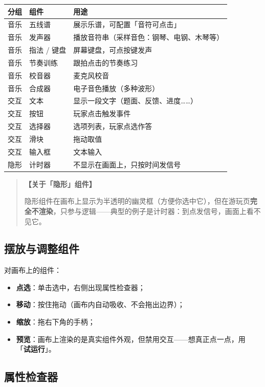 \documentclass[UTF8,a4paper,zihao=-4]{ctexart}
\newcommand{\ui}[1]{「\textbf{#1}」}  %
\newenvironment{tip}[1][提示]{%
  \begin{quote}\small\textbf{【#1】}\ignorespaces
}{\end{quote}}
\begin{document}
\begin{center}
\begin{tabular}{lll}
\toprule
分组 & 组件 & 用途 \\
\midrule
音乐 & 五线谱 & 展示乐谱，可配置「音符可点击」 \\
音乐 & 发声器 & 播放音符串（采样音色：钢琴、电钢、木琴等） \\
音乐 & 指法 / 键盘 & 屏幕键盘，可点按键发声 \\
音乐 & 节奏训练 & 跟拍点击的节奏练习 \\
音乐 & 校音器 & 麦克风校音 \\
音乐 & 合成器 & 电子音色播放（多种波形） \\
\midrule
交互 & 文本 & 显示一段文字（题面、反馈、进度……） \\
交互 & 按钮 & 玩家点击触发事件 \\
交互 & 选择器 & 选项列表，玩家点选作答 \\
交互 & 滑块 & 拖动取值 \\
交互 & 输入框 & 文本输入 \\
\midrule
隐形 & 计时器 & 不显示在画面上，只按时间发信号 \\
\bottomrule
\end{tabular}
\end{center}

\begin{tip}[关于「隐形」组件]
隐形组件在画布上显示为半透明的幽灵框（方便你选中它），但在游玩页\textbf{完全不渲染}，只参与逻辑——典型的例子是计时器：到点发信号，画面上看不见它。
\end{tip}

\subsection{摆放与调整组件}

对画布上的组件：

\begin{itemize}[nosep]
  \item \textbf{点选}：单击选中，右侧出现属性检查器；
  \item \textbf{移动}：按住拖动（画布内自动吸收、不会拖出边界）；
  \item \textbf{缩放}：拖右下角的手柄；
  \item \textbf{预览}：画布上渲染的是真实组件外观，但禁用交互——想真正点一点，用 \ui{试运行}。
\end{itemize}

\subsection{属性检查器}
\end{document}
